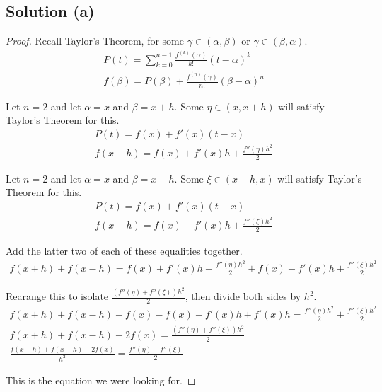 \documentclass[11pt]{article}
\begin{document}
    \subsection{Solution (a)}
        \begin{proof}
            Recall Taylor's Theorem, for some $\gamma \in (\alpha, \beta)$ or $\gamma \in (\beta, \alpha)$.
            \begin{gather}
                P(t) = \sum_{k = 0}^{n - 1} \frac{f^{(k)}(\alpha)}{k!}(t - \alpha)^k\\
                f(\beta) = P(\beta) + \frac{f^{(n)}(\gamma)}{n!}(\beta - \alpha)^n
            \end{gather}

            Let $n = 2$ and let $\alpha = x$ and $\beta = x + h$.
            Some $\eta \in (x,x + h)$ will satisfy Taylor's Theorem for this.
            \begin{gather}
                P(t) = f(x) + f'(x) (t - x)\\
                f(x + h) = f(x) + f'(x) h + \frac{f''(\eta) h^2}{2}
            \end{gather}

            Let $n = 2$ and let $\alpha = x$ and $\beta = x - h$.
            Some $\xi \in (x - h,x)$ will satisfy Taylor's Theorem for this.
            \begin{gather}
                P(t) = f(x) + f'(x) (t - x)\\
                f(x - h) = f(x) - f'(x) h + \frac{f''(\xi) h^2}{2}
            \end{gather}

            Add the latter two of each of these equalities together.
            \begin{gather}
                f(x + h) + f(x - h) = f(x) + f'(x) h + \frac{f''(\eta) h^2}{2} + f(x) - f'(x) h + \frac{f''(\xi) h^2}{2}
            \end{gather}

            Rearange this to isolate $\frac{(f''(\eta) + f''(\xi)) h^2}{2}$, then divide both sides by $h^2$.
            \begin{gather}
                f(x + h) + f(x - h) - f(x) - f(x) - f'(x) h + f'(x) h = \frac{f''(\eta) h^2}{2} + \frac{f''(\xi) h^2}{2}\\
                f(x + h) + f(x - h) - 2f(x) = \frac{(f''(\eta) + f''(\xi)) h^2}{2}\\
                \frac{f(x + h) + f(x - h) - 2f(x)}{h^2} = \frac{f''(\eta) + f''(\xi)}{2}
            \end{gather}

            This is the equation we were looking for.
        \end{proof}
\end{document}
